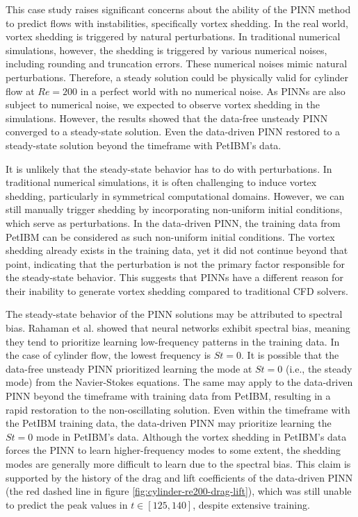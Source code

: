 
This case study raises significant concerns about the ability of the PINN method to predict flows with instabilities, specifically vortex shedding.
In the real world, vortex shedding is triggered by natural perturbations.
In traditional numerical simulations, however, the shedding is triggered by various numerical noises, including rounding and truncation errors.
These numerical noises mimic natural perturbations.
Therefore, a steady solution could be physically valid for cylinder flow at $Re = 200$ in a perfect world with no numerical noise.
As PINNs are also subject to numerical noise, we expected to observe vortex shedding in the simulations.
However, the results showed that the data-free unsteady PINN converged to a steady-state solution.
Even the data-driven PINN restored to a steady-state solution beyond the timeframe with PetIBM's data.

It is unlikely that the steady-state behavior has to do with perturbations.
In traditional numerical simulations, it is often challenging to induce vortex shedding, particularly in symmetrical computational domains.
However, we can still manually trigger shedding by incorporating non-uniform initial conditions, which serve as perturbations.
In the data-driven PINN, the training data from PetIBM can be considered as such non-uniform initial conditions.
The vortex shedding already exists in the training data, yet it did not continue beyond that point, indicating that the perturbation is not the primary factor responsible for the steady-state behavior.
This suggests that PINNs have a different reason for their inability to generate vortex shedding compared to traditional CFD solvers.

The steady-state behavior of the PINN solutions may be attributed to spectral bias.
Rahaman et al. \cite{rahaman_spectral_2019} showed that neural networks exhibit spectral bias, meaning they tend to prioritize learning low-frequency patterns in the training data.
In the case of cylinder flow, the lowest frequency is $St=0$.
It is possible that the data-free unsteady PINN prioritized learning the mode at $St=0$ (i.e., the steady mode) from the Navier-Stokes equations.
The same may apply to the data-driven PINN beyond the timeframe with training data from PetIBM, resulting in a rapid restoration to the non-oscillating solution.
Even within the timeframe with the PetIBM training data, the data-driven PINN may prioritize learning the $St=0$ mode in PetIBM's data.
Although the vortex shedding in PetIBM's data forces the PINN to learn higher-frequency modes to some extent, the shedding modes are generally more difficult to learn due to the spectral bias.
This claim is supported by the history of the drag and lift coefficients of the data-driven PINN (the red dashed line in figure \ref{fig:cylinder-re200-drag-lift}), which was still unable to predict the peak values in $t \in \left[125, 140\right]$, despite extensive training.


